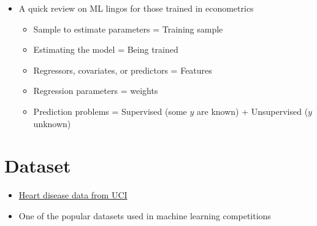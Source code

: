 \documentclass[
]{book}
\begin{document}
\begin{itemize}
  \begin{itemize}
  \item
    Developing algorithms (estimating \emph{f(x)})
  \item
    Prediction power, not structural/causal parameters
  \item
    Basically, high-dimensional data statistics (N \textless{} P)
  \item
    The major problem is to avoid \href{https://en.wikipedia.org/wiki/Curse_of_dimensionality}{``the curse of dimensionality''} (\href{https://towardsdatascience.com/the-curse-of-dimensionality-50dc6e49aa1e}{too many features - \textgreater{} overfitting})
  \item
    Validation: out-of-sample comparisons (cross-validation) not in-sample goodness-of-fit measures
  \item
    So, it's curve-fitting, but the primary focus is unseen (test data), not seen data (training data)
  \end{itemize}
\item
  A quick review on ML lingos for those trained in econometrics

  \begin{itemize}
  \item
    Sample to estimate parameters = Training sample
  \item
    Estimating the model = Being trained
  \item
    Regressors, covariates, or predictors = Features
  \item
    Regression parameters = weights
  \item
    Prediction problems = Supervised (some \(y\) are known) + Unsupervised (\(y\) unknown)
  \end{itemize}
\end{itemize}

\section{Dataset}\label{dataset}

\begin{itemize}
\item
  \href{https://archive.ics.uci.edu/ml/datasets/heart+Disease}{Heart disease data from UCI}
\item
  One of the popular datasets used in machine learning competitions
\end{itemize}
\end{document}

